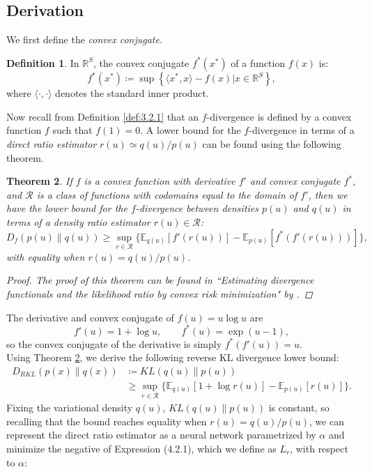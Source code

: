 \documentclass[honours,12pt, twoside]{unswthesis}
\newcommand{\R}{\mathbb{R}}
\newtheorem{theorem}{Theorem}[section]
\numberwithin{equation}{section}
\theoremstyle{definition}
\newtheorem{definition}[theorem]{Definition}
\begin{document}
\subsection{Derivation}\label{sec:4.2.1}
We first define the \textit{convex conjugate}.
\begin{definition}
In $\R^S$, the convex conjugate $f^*(x^*)$ of a function $f(x)$ is:
\[f^*(x^*)\coloneqq \sup\left\lbrace\langle x^*,x\rangle-f(x)|x\in \R^S\right\rbrace,\]
where $\langle\cdot, \cdot\rangle$ denotes the standard inner product.
\end{definition}
Now recall from Definition \ref{def:3.2.1} that an $f$-divergence is defined by a convex function $f$ such that $f(1)=0$. A lower bound for the $f$-divergence in terms of a \textit{direct ratio estimator} $r(u)\simeq q(u)/p(u)$ can be found using the following theorem.
\begin{theorem}\label{4.2.1}  \citep{nguyen}
If $f$ is a convex function with derivative $f'$ and convex conjugate $f^*$, and $\mathcal{R}$ is a class of functions with codomains equal to the domain of $f'$, then we have the lower bound for the $f$-divergence between densities $p(u)$ and $q(u)$ in terms of a density ratio estimator $r(u)\in \mathcal{R}$:
\[D_f (p(u)\|q(u))\geq \sup_{r\in \mathcal{R}} \{\mathbb{E}_{q(u)}[f'(r(u))]-\mathbb{E}_{p(u)}[f^*(f'(r(u)))]\},\]
with equality when $r(u)=q(u)/p(u)$.
\begin{proof}
The proof of this theorem can be found in ``Estimating divergence functionals and the likelihood ratio by convex risk minimization" by \citet{nguyen}.
\end{proof}
\end{theorem}
The derivative and convex conjugate of $f(u)=u\log u$ are
\[f'(u)=1+\log u, \qquad f^*(u)=\exp(u-1),\]
so the convex conjugate of the derivative is simply $f^*(f'(u))=u$.\\
Using Theorem \ref{4.2.1}, we derive the following reverse KL divergence lower bound:
\begin{align}
D_{RKL}(p(x)\|q(x))&\coloneqq KL(q(u)\|p(u))\nonumber\\
&\geq \sup_{r\in \mathcal{R}}\{\mathbb{E}_{q(u)}[1+\log r(u)]-\mathbb{E}_{p(u)}[r(u)]\}.
\end{align}
Fixing the variational density $q(u)$, $KL(q(u)\|p(u))$ is constant, so recalling that the bound reaches equality when $r(u)=q(u)/p(u)$, we can represent the direct ratio estimator as a neural network parametrized by $\alpha$ and minimize the negative of Expression (4.2.1), which we define as $L_r$, with respect to $\alpha$:
\end{document}
